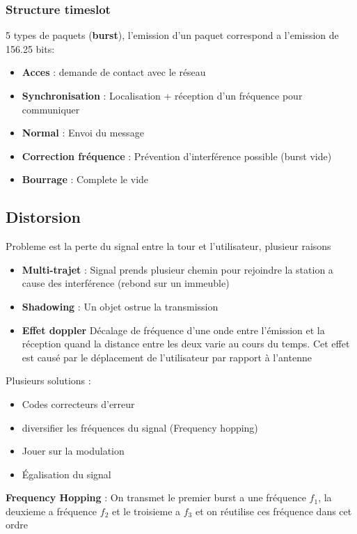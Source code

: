  		\subsubsection{Structure timeslot}
 			5 types de paquets (\textbf{burst}), l'emission d'un paquet  correspond a l'emission de 156.25 bits:
 			
 			\begin{itemize}
 				\item \textbf{Acces} : demande de contact avec le réseau
 				\item \textbf{Synchronisation} : Localisation + réception d'un fréquence pour communiquer
 				\item \textbf{Normal} : Envoi du message
 				\item \textbf{Correction fréquence} : Prévention d'interférence possible (burst vide)
 				\item \textbf{Bourrage} : Complete le vide
 			\end{itemize}
 			
 	\subsection{Distorsion}
 		Probleme est la perte du signal entre la tour et l'utilisateur, plusieur raisons
 		\begin{itemize}
 			\item \textbf{Multi-trajet} : Signal prends plusieur chemin pour rejoindre la station a cause des interférence (rebond sur un immeuble)
 			\item \textbf{Shadowing} : Un objet ostrue la transmission
 			\item \textbf{Effet doppler} Décalage de fréquence d’une onde entre l’émission et la réception quand la distance entre les deux varie au cours du temps. Cet effet est causé par le déplacement de l’utilisateur par rapport à l’antenne
 		\end{itemize}
 		
 		Plusieurs solutions :
 		\begin{itemize}
 			\item Codes correcteurs d'erreur
 			\item diversifier les fréquences du signal (Frequency hopping)
 			\item Jouer sur la modulation
 			\item Égalisation du signal
 		\end{itemize}
 		
 		\textbf{Frequency Hopping} : On transmet le premier burst a une fréquence $f_1$, la deuxieme a fréquence $f_2$ et le troisieme a $f_3$ et on réutilise ces fréquence dans cet ordre
 		
